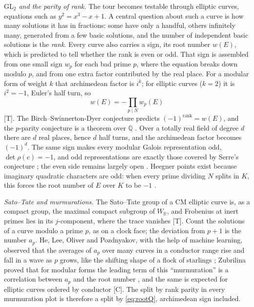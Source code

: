 \documentclass[11pt]{amsart}
\numberwithin{equation}{section}
\newcommand{\Q}{\mathbb{Q}}
\newcommand{\R}{\mathbb{R}}
\newcommand{\GL}{\mathrm{GL}}
\begin{document}
\emph{$\GL_2$ and the parity of rank.} The tour becomes testable through elliptic curves, equations such as $y^2=x^3-x+1$. A central question about such a curve is how many solutions it has in fractions: some have only a handful, others infinitely many, generated from a few basic solutions, and the number of independent basic solutions is the \emph{rank}. Every curve also carries a sign, its root number $w(E)$, which is predicted to tell whether the rank is even or odd. That sign is assembled from one small sign $w_p$ for each bad prime $p$, where the equation breaks down modulo $p$, and from one extra factor contributed by the real place. For a modular form of weight $k$ that archimedean factor is $i^k$; for elliptic curves ($k=2$) it is $i^2=-1$, Euler's half turn, so
\begin{equation}\label{eq:rootQ}
w(E)=-\prod_{p\mid N}w_p(E)
\end{equation}
[T]. The Birch--Swinnerton-Dyer conjecture predicts $(-1)^{\mathrm{rank}}=w(E)$, and the $p$-parity conjecture is a theorem over $\Q$ \cite{DokchitserDokchitser2010}. Over a totally real field of degree $d$ there are $d$ real places, hence $d$ half turns, and the archimedean factor becomes $(-1)^d$. The same sign makes every modular Galois representation odd, $\det\rho(c)=-1$, and odd representations are exactly those covered by Serre's conjecture \cite{KhareWintenberger2009}; the even side remains largely open \cite{Calegari2011}. Heegner points exist because imaginary quadratic characters are odd: when every prime dividing $N$ splits in $K$, this forces the root number of $E$ over $K$ to be $-1$ \cite{GrossZagier1986}.

\emph{Sato--Tate and murmurations.} The Sato--Tate group of a CM elliptic curve is, as a compact group, the maximal compact subgroup of $W_\R$, and Frobenius at inert primes lies in its $j$-component, where the trace vanishes [T]. Count the solutions of a curve modulo a prime $p$, as on a clock face; the deviation from $p+1$ is the number $a_p$. He, Lee, Oliver and Pozdnyakov, with the help of machine learning, observed that the averages of $a_p$ over many curves in a conductor range rise and fall in a wave as $p$ grows, like the shifting shape of a flock of starlings \cite{HLOP2022}; Zubrilina proved that for modular forms the leading term of this ``murmuration'' is a correlation between $a_p$ and the root number \cite{Zubrilina2023}, and the same is expected for elliptic curves ordered by conductor [C]. The split by rank parity in every murmuration plot is therefore a split by \eqref{eq:rootQ}, archimedean sign included.
\end{document}
